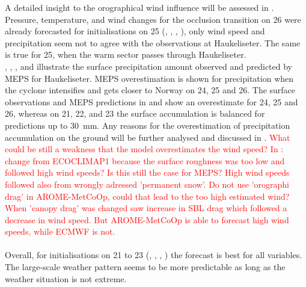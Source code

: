 A detailed insight to the orographical wind influence will be assessed in . 
\\
Pressure, temperature, and wind changes for the occlusion transition on \SI{26}{\dec} were already forecasted for initialisations on \SI{25}{\dec} (, , , ), only wind speed and precipitation seem not to agree with the observations at Haukeliseter. The same is true for \SI{25}{\dec}, when the warm sector passes through Haukeliseter. 
\\
, , , and  illustrate the surface precipitation amount observed and predicted by MEPS for Haukeliseter. MEPS overestimation is shown for precipitation when the cyclone intensifies and gets closer to Norway on \num{24}, \num{25} and \SI{26}{\dec}. The surface observations and MEPS predictions in  and  show an overestimate for \num{24}, \num{25} and \SI{26}{\dec}, whereas on \num{21}, \num{22}, and \SI{23}{\dec} the surface accumulation is balanced for  predictions up to \SI{30}{\mm}. Any reasons for the overestimation of precipitation accumulation on the ground will be further analysed and discussed in . 
\textcolor{red}{What could be still a weakness that the model overestimates the wind speed? In \citet{muller_arome-metcoop:_2017}: change from ECOCLIMAP1 because the surface roughness was too low and followed high wind speeds? Is this still the case for MEPS? High wind speeds followed also from wrongly adressed 'permanent snow'. Do not use 'orographi drag' in AROME-MetCoOp, could that lead to the too high estimated wind? When 'canopy drag' was changed saw increase in SBL drag which followed a decrease in wind speed. But AROME-MetCoOp is able to forecast high wind speeds, while ECMWF is not.}
\\
\\
Overall, for initialisations on \num{21} to \SI{23}{\dec} (, , , ) the forecast is best for all variables. 
The large-scale weather pattern seems to be more predictable as long as the weather situation is not extreme.
